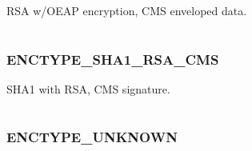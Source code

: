 \documentclass[letterpaper,10pt,english]{sphinxmanual}
\begin{document}
RSA w/OEAP encryption, CMS enveloped data.

\begin{tabulary}{\linewidth}{|L|L|}
\hline

 & 
\\
\hline\end{tabulary}



\subsubsection{ENCTYPE\_SHA1\_RSA\_CMS}
\label{appdev/refs/macros/ENCTYPE_SHA1_RSA_CMS::doc}\label{appdev/refs/macros/ENCTYPE_SHA1_RSA_CMS:enctype-sha1-rsa-cms-data}\label{appdev/refs/macros/ENCTYPE_SHA1_RSA_CMS:enctype-sha1-rsa-cms}

\begin{fulllineitems}
\label{appdev/refs/macros/ENCTYPE_SHA1_RSA_CMS:ENCTYPE_SHA1_RSA_CMS}
\end{fulllineitems}


SHA1 with RSA, CMS signature.

\begin{tabulary}{\linewidth}{|L|L|}
\hline

 & 
\\
\hline\end{tabulary}



\subsubsection{ENCTYPE\_UNKNOWN}
\label{appdev/refs/macros/ENCTYPE_UNKNOWN:enctype-unknown}\label{appdev/refs/macros/ENCTYPE_UNKNOWN::doc}\label{appdev/refs/macros/ENCTYPE_UNKNOWN:enctype-unknown-data}

\begin{fulllineitems}
\label{appdev/refs/macros/ENCTYPE_UNKNOWN:ENCTYPE_UNKNOWN}
\end{fulllineitems}


\begin{tabulary}{\linewidth}{|L|L|}
\hline

 & 
\\
\hline\end{tabulary}
\end{document}
